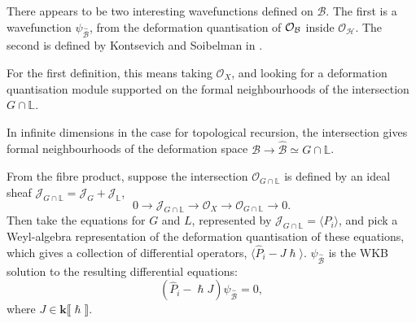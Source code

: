     
    There appears to be two interesting wavefunctions defined on \(  \mathcal{B}\). The first is a wavefunction \( \psi_{\overset{\sim}{\mathcal{B}}}\), from the deformation quantisation of  \(\mathcal{O}_{\mathcal{B}}\) inside \( \mathcal{O}_\mathcal{H}\). The second is defined by Kontsevich and Soibelman in \cite[p. 53]{ks_airy}.
    
    For the first definition, this means taking \( \mathcal{O}_X\), and looking for a deformation quantisation module supported on the formal neighbourhoods of the intersection \(  G \cap \mathbb{L} \). 
    
    \begin{rem}
    In infinite dimensions in the case for topological recursion, the intersection gives formal neighbourhoods of the deformation space
    \(\mathcal{B} \rightarrow \widehat{\mathcal{B}}  \simeq G \cap \mathbb{L}\).
    \end{rem}
    
    From the fibre product, suppose the intersection \( \mathcal{O}_{G \cap \mathbb{L} }\) is defined by an ideal sheaf \( \mathcal{J}_{G \cap \mathbb{L} } = \mathcal{J}_G + \mathcal{J}_\mathbb{L}\),
    \begin{equation}
        \label{eqn:seqforB}
        0 \rightarrow \mathcal{J}_{G \cap \mathbb{L}} \rightarrow \mathcal{O}_X \rightarrow \mathcal{O}_{G \cap \mathbb{L}} \rightarrow 0.
    \end{equation}
    Then take the equations for \(G\) and \(L\), represented by \( \mathcal{J}_{G \cap \mathbb{L}} = \langle P_i \rangle\), and pick a Weyl-algebra representation of the deformation quantisation of these equations, which gives a collection of differential operators, \( \langle \hat{P}_i - J \hslash \rangle \). \(\psi_{\overset{\sim}{\mathcal{B}}}\) is the WKB solution to the resulting differential equations:
    \[ (\hat{P}_i - \hslash J ) \psi_{\overset{\sim}{\mathcal{B}}} = 0,\]
    where \( J \in \mathbf{k} \lBrack \hslash \rBrack\).

